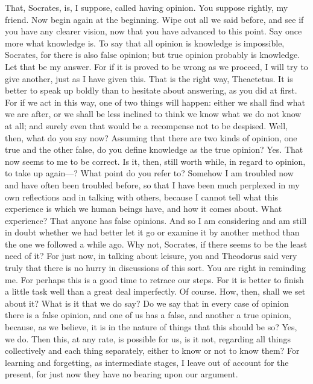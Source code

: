 \documentclass[letterpaper,12pt]{article}
\newcommand{\stephpag}[1]{\marginnote{\small\itshape\fontfamily{ppl}\selectfont #1}}
\begin{document}
\begin{drama}
\theaetetusspeaks
That, Socrates, is, I suppose, called having opinion.
\socratesspeaks
You suppose rightly, my friend. Now begin again \stephpag{b} at the beginning. Wipe out all we said before, and see if you have any clearer vision, now that you have advanced to this point. Say once more what knowledge is.
\theaetetusspeaks
To say that all opinion is knowledge is impossible, Socrates, for there is also false opinion; but true opinion probably is knowledge. Let that be my answer. For if it is proved to be wrong as we proceed, I will try to give another, just as I have given this.
\socratesspeaks
That is the right way, Theaetetus. It is better to speak up boldly than to hesitate about answering, as you did at first. For if we act in this way, one of two things will happen: either we shall find what we are after, \stephpag{c} or we shall be less inclined to think we know what we do not know at all; and surely even that would be a recompense not to be despised. Well, then, what do you say now? Assuming that there are two kinds of opinion, one true and the other false, do you define knowledge as the true opinion?
\theaetetusspeaks
Yes. That now seems to me to be correct.
\socratesspeaks
Is it, then, still worth while, in regard to opinion, to take up again—?
\theaetetusspeaks
What point do you refer to?
\socratesspeaks
Somehow I am troubled now and have often been troubled before, \stephpag{d} so that I have been much perplexed in my own reflections and in talking with others, because I cannot tell what this experience is which we human beings have, and how it comes about.
\theaetetusspeaks
What experience?
\socratesspeaks
That anyone has false opinions. And so I am considering and am still in doubt whether we had better let it go or examine it by another method than the one we followed a while ago.
\theaetetusspeaks
Why not, Socrates, if there seems to be the least need of it? For just now, in talking about leisure, you and Theodorus said very truly that there is no hurry in discussions of this sort. \stephpag{e}
\socratesspeaks
You are right in reminding me. For perhaps this is a good time to retrace our steps. For it is better to finish a little task well than a great deal imperfectly.
\theaetetusspeaks
Of course.
\socratesspeaks
How, then, shall we set about it? What is it that we do say? Do we say that in every case of opinion there is a false opinion, and one of us has a false, and another a true opinion, because, as we believe, it is in the nature of things that this should be so?
\theaetetusspeaks
Yes, we do. \stephpag{188 a}
\socratesspeaks
Then this, at any rate, is possible for us, is it not, regarding all things collectively and each thing separately, either to know or not to know them? For learning and forgetting, as intermediate stages, I leave out of account for the present, for just now they have no bearing upon our argument.

\end{drama}
\end{document}
